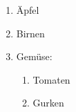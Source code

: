 \documentclass{article}
\begin{document}
  \begin{enumerate}
    \item Äpfel
    \item Birnen
    \item Gemüse:
        \begin{enumerate}
            \item Tomaten
            \item Gurken
        \end{enumerate}
  \end{enumerate}
\end{document}
